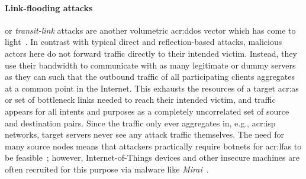 \paragraph{Link-flooding attacks}
 or \emph{transit-link} attacks are another volumetric \gls{acr:ddos} vector which has come to light~\parencite{DBLP:conf/esorics/StuderP09,DBLP:conf/sp/KangLG13}.
In contrast with typical direct and reflection-based attacks, malicious actors here do not forward traffic directly to their intended victim.
Instead, they use their bandwidth to communicate with as many legitimate or dummy servers as they can such that the outbound traffic of all participating clients aggregates at a common point in the Internet.
This exhausts the resources of a target \gls{acr:as} or set of bottleneck links needed to reach their intended victim, and traffic appears for all intents and purposes as a completely uncorrelated set of source and destination pairs.
Since the traffic only ever aggregates in, e.g., \gls{acr:isp} networks, target servers never see any attack traffic themselves.
The need for many source nodes means that attackers practically require botnets for \glspl{acr:lfa} to be feasible~\parencite{DBLP:conf/sp/SmithS18}; however, Internet-of-Things devices and other insecure machines are often recruited for this purpose via malware like \emph{Mirai}~\parencite{DBLP:conf/uss/AntonakakisABBB17}.


